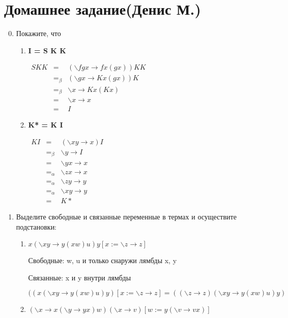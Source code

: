 \documentclass[fontsize=14pt, paper=a4, pagesize, DIV=calc]{article}
\newcommand{\lam}[2]{\backslash #1 \rightarrow #2}
\begin{document}
\section{Домашнее задание(Денис М.)}

\begin{enumerate}
\setcounter{enumi}{-1}
\item Покажите, что

\begin{enumerate}
\item {\bf I = S K K}

$\begin{array}{lcl} 
S K K & = & (\lam{fgx}{f x (g x)}) K K \\ 
      & =_{\beta} & (\lam{gx}{K x (g x))} K \\
      & =_{\beta} & \lam{x}{K x (K x)} \\
      & = & \lam{x}{x} \\
      & = & I
\end{array}$

\item {\bf K* = K I}

$\begin{array}{lcl} 
K I & = & (\lam{xy}{x}) I \\ 
    & =_{\beta} & \lam{y}{I} \\ 
    & = & \lam{yx}{x} \\ 
    & =_{\alpha} & \lam{zx}{x} \\ 
    & =_{\alpha} & \lam{zy}{y} \\ 
    & =_{\alpha} & \lam{xy}{y} \\ 
    & = & K*
\end{array}$

\end{enumerate}

\item Выделите свободные и связанные переменные в термах и осуществите подстановки:

\begin{enumerate}
\item $x(\lam{xy}{y (x w) u})y[x := \lam{z}{z}]$

Свободные: w, u и только снаружи лямбды x, y

Связанные: x и y внутри лямбды 

$((x(\lam{xy}{y (x w) u})y)[x := \lam{z}{z}] = ((\lam{z}{z})(\lam{xy}{y (x w) u})y)$

\item $(\lam{x}{x (\lam{y}{y x}) w}) (\lam{x}{v}) [w := y (\lam{v}{v x})] $


\end{enumerate}
\end{enumerate}
\end{document}
